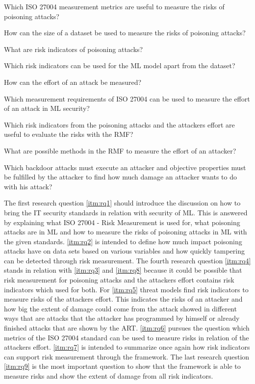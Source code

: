 \begin{questions}
  \item Which ISO 27004 measurement metrics are useful to measure the risks of poisoning attacks? \label{itm:rq1}
  \item How can the size of a dataset be used to measure the risks of poisoning attacks? \label{itm:rq2}
  \item What are risk indicators of poisoning attacks? \label{itm:rq3}
  \item Which risk indicators can be used for the ML model apart from the dataset? \label{itm:rq4}
  \item How can the effort of an attack be measured? \label{itm:rq5}
  \item Which measurement requirements of ISO 27004 can be used to measure the effort of an attack in ML security? \label{itm:rq6}
  \item Which risk indicators from the poisoning attacks and the attackers effort are useful to evaluate the risks with the RMF? \label{itm:rq7}
  \item What are possible methods in the RMF to measure the effort of an attacker? \label{itm:rq8}
  \item Which backdoor attacks must execute an attacker and objective properties must be fulfilled by the attacker to find how much damage an attacker wants to do with his attack? \label{itm:rq9}
\end{questions}

The first research question \ref{itm:rq1} should introduce the discussion on how to bring the IT security standards in relation with security of ML. This is answered by explaining what ISO 27004 - Risk
Measurement is used for, what poisoning attacks are in ML and how to measure the risks of poisoning attacks in ML with the given standards. \ref{itm:rq2} is intended to define how much impact poisoning
attacks have on data sets based on various variables and how quickly tampering can be detected through risk measurement. The fourth research question \ref{itm:rq4} stands in relation with \ref{itm:rq3} and \ref{itm:rq8} because it could be possible that risk measurement for poisoning attacks and the attackers effort contains risk indicators which used for both. For \ref{itm:rq5} threat models find risk indicators to measure risks of the attackers effort. This indicates the risks of an attacker and how big the extent of damage could come from the attack showed in different ways that are attacks that the attacker has programmed by himself or already finished attacks that are shown by the ART. \ref{itm:rq6} pursues the question which metrics of the ISO 27004 standard can be used to measure risks in relation of the attackers effort. \ref{itm:rq7} is intended to summarize once again how risk indicators can support risk measurement through the framework. The last research question \ref{itm:rq9} is the most important question to show that the framework is able to measure risks and show the extent of damage from all risk indicators.
